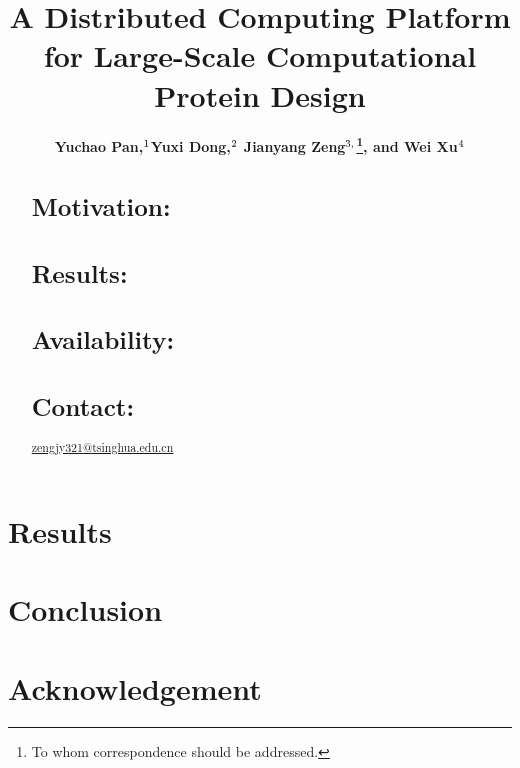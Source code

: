 \documentclass[singlecolumdfsn]{bioinfo}
\begin{document}
\title[A Distributed Computing Platform for Large-Scale Computational Protein Design]{A Distributed Computing Platform for Large-Scale Computational Protein Design}
\author[Y. Pan and Y. Dong]{\bf Yuchao Pan,$^{\rm 1}$Yuxi Dong,$^{\rm 2}$ Jianyang Zeng$^{\rm 3,}$\footnote{To whom correspondence should be addressed.}, and Wei Xu$^{\rm 4}$}
%
\address{$^{\rm 1}$, $^{\rm 2}$, $^{\rm 3}$ and $^{\rm 4}$}

\history{}

\editor{}
%
\maketitle

%




\begin{abstract}
\section{Motivation:}

\section{Results:}

\section{Availability:}

\section{Contact:} \href{zengjy321@tsinghua.edu.cn}{zengjy321@tsinghua.edu.cn}

\end{abstract}


\vspace{-10pt}









\section{Results}


\section{Conclusion}\label{sec:conclusion}




\section*{Acknowledgement}





%
%

%

 \vspace{-12pt}
\end{document}
